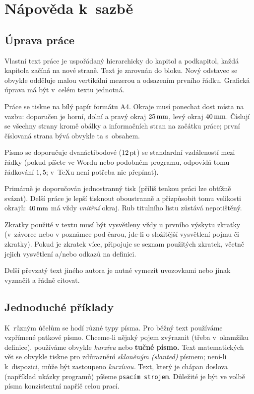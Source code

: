 
\chapter{Nápověda k~sazbě}

\section{Úprava práce}

Vlastní text práce je uspořádaný hierarchicky do kapitol a podkapitol,
každá kapitola začíná na nové straně. Text je zarovnán do bloku. Nový odstavec
se obvykle odděluje malou vertikální mezerou a odsazením prvního řádku. Grafická
úprava má být v~celém textu jednotná.

Práce se tiskne na bílý papír formátu A4. Okraje musí ponechat dost místa na vazbu:
doporučen je horní, dolní a pravý okraj $25\,\rm mm$, levý okraj $40\,\rm mm$.
Číslují se všechny strany kromě obálky a informačních stran na začátku práce;
první číslovaná strana bývá obvykle ta s~obsahem.

Písmo se doporučuje dvanáctibodové ($12\,\rm pt$) se standardní vzdáleností mezi řádky
(pokud píšete ve Wordu nebo podobném programu, odpovídá tomu řádkování $1,5$; v~\TeX{}u
není potřeba nic přepínat).

Primárně je doporučován jednostranný tisk (příliš tenkou práci lze obtížně svázat).
Delší práce je lepší tisknout oboustranně a přizpůsobit tomu velikosti okrajů:
$40\,\rm mm$ má vždy \emph{vnitřní} okraj. Rub titulního listu zůstává nepotištěný.

Zkratky použité v textu musí být vysvětleny vždy u prvního výskytu zkratky (v~závorce nebo
v poznámce pod čarou, jde-li o složitější vysvětlení pojmu či zkratky). Pokud je zkratek
více, připojuje se seznam použitých zkratek, včetně jejich vysvětlení a/nebo odkazů
na definici.

Delší převzatý text jiného autora je nutné vymezit uvozovkami nebo jinak vyznačit a řádně
citovat.

\section{Jednoduché příklady}

K~různým účelům se hodí různé typy písma.
Pro běžný text používáme vzpřímené patkové písmo.
Chceme-li nějaký pojem zvýraznit (třeba v~okamžiku definice), používáme obvykle
\textit{kurzívu} nebo \textbf{tučné písmo.}
Text matematických vět se obvykle tiskne pro zdůraznění \textsl{skloněným (slanted)} písmem;
není-li k~dispozici, může být zastoupeno \textit{kurzívou.}
Text, který je chápan doslova (například ukázky programů) píšeme \texttt{psacím strojem}.
Důležité je být ve volbě písma konzistentní napříč celou prací.

